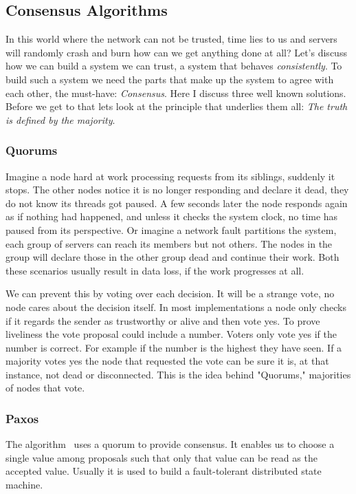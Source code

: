\subsection{Consensus Algorithms}
In this world where the network can not be trusted, time lies to us and servers will randomly crash and burn how can we get anything done at all? Let's discuss how we can build a system we can trust, a system that behaves \textit{consistently}. To build such a system we need the parts that make up the system to agree with each other, the must-have: \emph{Consensus}. Here I discuss three well known solutions. Before we get to that lets look at the principle that underlies them all: \emph{The truth is defined by the majority}.

\subsubsection*{Quorums}
Imagine a node hard at work processing requests from its siblings, suddenly it stops. The other nodes notice it is no longer responding and declare it dead, they do not know its threads got paused. A few seconds later the node responds again as if nothing had happened, and unless it checks the system clock, no time has paused from its perspective. Or imagine a network fault partitions the system, each group of servers can reach its members but not others. The nodes in the group will declare those in the other group dead and continue their work. Both these scenarios usually result in data loss, if the work progresses at all.

We can prevent this by voting over each decision. It will be a strange vote, no node cares about the decision itself. In most implementations a node only checks if it regards the sender as trustworthy or alive and then vote yes. To prove liveliness the vote proposal could include a number. Voters only vote yes if the number is correct. For example if the number is the highest they have seen. If a majority votes yes the node that requested the vote can be sure it is, at that instance, not dead or disconnected. This is the idea behind "Quorums," majorities of nodes that vote.

\subsubsection*{Paxos}
The \paxos{} algorithm~\cite{paxos} uses a quorum to provide consensus. It enables us to choose a single value among proposals such that only that value can be read as the accepted value. Usually it is used to build a fault-tolerant distributed state machine. 

